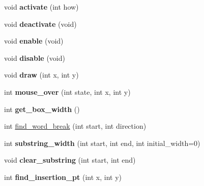 \begin{DoxyCompactItemize}
\item 
\hypertarget{classGLUI__TextBox_a700f7d07a42c613b95f212959a7329d2}{void {\bfseries activate} (int how)}\label{classGLUI__TextBox_a700f7d07a42c613b95f212959a7329d2}

\item 
\hypertarget{classGLUI__TextBox_ad622284de7190c5c51de5538fb076b79}{void {\bfseries deactivate} (void)}\label{classGLUI__TextBox_ad622284de7190c5c51de5538fb076b79}

\item 
\hypertarget{classGLUI__TextBox_a907c7dc3dcef136f551cb73ca243143a}{void {\bfseries enable} (void)}\label{classGLUI__TextBox_a907c7dc3dcef136f551cb73ca243143a}

\item 
\hypertarget{classGLUI__TextBox_ac04b5e44ae6d804ea3b499ee017f6b22}{void {\bfseries disable} (void)}\label{classGLUI__TextBox_ac04b5e44ae6d804ea3b499ee017f6b22}

\item 
\hypertarget{classGLUI__TextBox_a7bc1b7cdead3e55b2e39c6258284ef05}{void {\bfseries draw} (int x, int y)}\label{classGLUI__TextBox_a7bc1b7cdead3e55b2e39c6258284ef05}

\item 
\hypertarget{classGLUI__TextBox_abd6406a461f85db80f75a806f3da29d8}{int {\bfseries mouse\-\_\-over} (int state, int x, int y)}\label{classGLUI__TextBox_abd6406a461f85db80f75a806f3da29d8}

\item 
\hypertarget{classGLUI__TextBox_aab2bc7ff59e3fb9a7ec6accd98588e61}{int {\bfseries get\-\_\-box\-\_\-width} ()}\label{classGLUI__TextBox_aab2bc7ff59e3fb9a7ec6accd98588e61}

\item 
int \hyperlink{classGLUI__TextBox_a56832b2b1802b0d6b1af218ffb1bf8e9}{find\-\_\-word\-\_\-break} (int start, int direction)
\item 
\hypertarget{classGLUI__TextBox_af2b6cbe72c04724ea70d0801bb0981fb}{int {\bfseries substring\-\_\-width} (int start, int end, int initial\-\_\-width=0)}\label{classGLUI__TextBox_af2b6cbe72c04724ea70d0801bb0981fb}

\item 
\hypertarget{classGLUI__TextBox_abbd297802e6809cceb4acda92e877d83}{void {\bfseries clear\-\_\-substring} (int start, int end)}\label{classGLUI__TextBox_abbd297802e6809cceb4acda92e877d83}

\item 
\hypertarget{classGLUI__TextBox_ac2c3d5638dcc068ba1fc58a39744f787}{int {\bfseries find\-\_\-insertion\-\_\-pt} (int x, int y)}\label{classGLUI__TextBox_ac2c3d5638dcc068ba1fc58a39744f787}


\end{DoxyCompactItemize}
